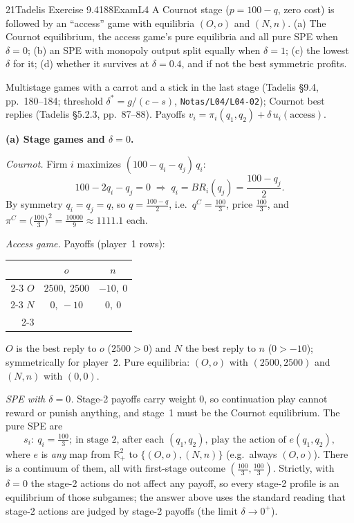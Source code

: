 \begin{exsol}{21}{Tadelis Exercise 9.4}{188}{Exam}{L4}
\asked A Cournot stage ($p = 100 - q$, zero cost) is followed by an ``access'' game with
equilibria $(O,o)$ and $(N,n)$. (a) The Cournot equilibrium, the access game's pure equilibria and
all pure SPE when $\delta = 0$; (b) an SPE with monopoly output split equally when $\delta = 1$;
(c) the lowest $\delta$ for it; (d) whether it survives at $\delta = 0.4$, and if not the best
symmetric profits.

\method Multistage games with a carrot and a stick in the last stage (Tadelis \S9.4,
pp.~180--184; threshold $\delta^* = g/(c - s)$, \texttt{Notas/L04/L04-02}); Cournot best replies
(Tadelis \S5.2.3, pp.~87--88). Payoffs $v_i = \pi_i(q_1, q_2) + \delta\,u_i(\text{access})$.

\solution
\textbf{(a) Stage games and $\delta = 0$.}

\emph{Cournot.} Firm $i$ maximizes $(100 - q_i - q_j)\,q_i$:
\begin{equation}
  100 - 2q_i - q_j = 0 \;\Rightarrow\; q_i = BR_i(q_j) = \frac{100 - q_j}{2}. \label{eq:21br}
\end{equation}
By symmetry $q_i = q_j = q$, so $q = \frac{100 - q}{2}$, i.e.\ $q^C = \frac{100}{3}$, price
$\frac{100}{3}$, and $\pi^C = \bigl(\frac{100}{3}\bigr)^2 = \frac{10000}{9} \approx 1111.1$ each.

\emph{Access game.} Payoffs (player~1 rows):
\begin{center}
\begin{tabular}{r|c|c|}
\multicolumn{1}{r}{} & \multicolumn{1}{c}{$o$} & \multicolumn{1}{c}{$n$}\\ \cline{2-3}
$O$ & $2500,\ 2500$ & $-10,\ 0$ \\ \cline{2-3}
$N$ & $0,\ -10$ & $0,\ 0$ \\ \cline{2-3}
\end{tabular}
\end{center}
$O$ is the best reply to $o$ ($2500 > 0$) and $N$ the best reply to $n$ ($0 > -10$); symmetrically
for player~2. Pure equilibria: $(O,o)$ with $(2500, 2500)$ and $(N,n)$ with $(0,0)$.

\emph{SPE with $\delta = 0$.} Stage-2 payoffs carry weight $0$, so continuation play cannot reward or
punish anything, and stage~1 must be the Cournot equilibrium. The pure SPE are
\[
  s_i:\ q_i = \tfrac{100}{3};\ \text{in stage 2, after each } (q_1, q_2),\ \text{play the action
  of } e(q_1, q_2),
\]
where $e$ is \emph{any} map from $\mathbb{R}_+^2$ to $\{(O,o), (N,n)\}$ (e.g.\ always $(O,o)$).
There is a continuum of them, all with first-stage outcome $(\frac{100}{3}, \frac{100}{3})$.
Strictly, with $\delta = 0$ the stage-2 actions do not affect any payoff, so every stage-2 profile
is an equilibrium of those subgames; the answer above uses the standard reading that stage-2
actions are judged by stage-2 payoffs (the limit $\delta \to 0^+$).


\end{exsol}
